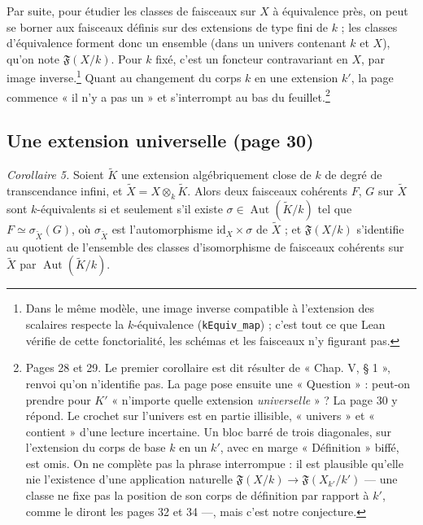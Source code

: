 \documentclass[11pt,a4paper]{article}
\begin{document}
Par suite, pour étudier les classes de faisceaux sur $X$ à équivalence
près, on peut se borner aux faisceaux définis sur des extensions de type
fini de $k$ ; les classes d'équivalence forment donc un ensemble (dans un
univers contenant $k$ et $X$), qu'on note $\mathfrak{F}(X/k)$. Pour $k$
fixé, c'est un foncteur contravariant en $X$, par image inverse.\footnote{Dans le même modèle, une image inverse compatible à
l'extension des scalaires respecte la $k$-équivalence
(\texttt{kEquiv\_map}) ; c'est tout ce que Lean vérifie de cette
fonctorialité, les schémas et les faisceaux n'y figurant pas.} Quant au
changement du corps $k$ en une extension $k'$, la page commence « il n'y a
pas un » et s'interrompt au bas du feuillet.\footnote{Pages 28 et 29. Le
premier corollaire est dit résulter de « Chap. V, § 1 », renvoi qu'on
n'identifie pas. La page pose ensuite une « Question » : peut-on prendre
pour $K'$ « n'importe quelle extension \emph{universelle} » ? La page 30 y
répond. Le crochet sur l'univers est en partie illisible, « univers » et « contient » d'une lecture incertaine. Un bloc barré de trois diagonales,
sur l'extension du corps de base $k$ en un $k'$, avec en marge
« Définition » biffé, est omis. On ne complète pas la phrase interrompue :
il est plausible qu'elle nie l'existence d'une application naturelle
$\mathfrak{F}(X/k) \to \mathfrak{F}(X_{k'}/k')$ --- une classe ne fixe pas
la position de son corps de définition par rapport à $k'$, comme le diront
les pages 32 et 34 ---, mais c'est notre conjecture.}

\subsection*{Une extension universelle (page 30)}

\emph{Corollaire 5.} Soient $\widetilde{K}$ une extension algébriquement
close de $k$ de degré de transcendance infini, et
$\widetilde{X} = X \otimes_k \widetilde{K}$. Alors deux faisceaux cohérents
$F$, $G$ sur $\widetilde{X}$ sont $k$-équivalents si et seulement s'il
existe $\sigma \in \operatorname{Aut}(\widetilde{K}/k)$ tel que
$F \simeq \sigma_{\widetilde{X}}(G)$, où $\sigma_{\widetilde{X}}$ est
l'automorphisme $\mathrm{id}_X \times \sigma$ de $\widetilde{X}$ ; et
$\mathfrak{F}(X/k)$ s'identifie au quotient de l'ensemble des classes
d'isomorphisme de faisceaux cohérents sur $\widetilde{X}$ par
$\operatorname{Aut}(\widetilde{K}/k)$.
\end{document}
